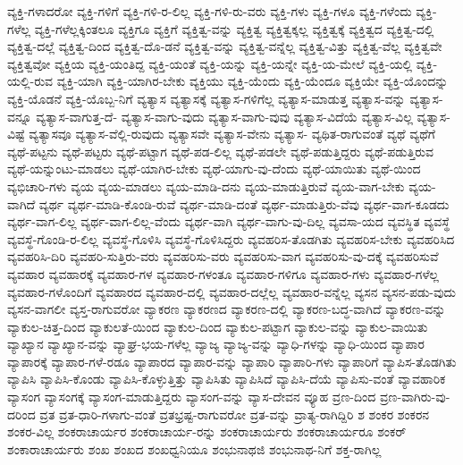 {ವ್ಯಕ್ತಿ-ಗಳಾದರೋ
ವ್ಯಕ್ತಿ-ಗಳಿಗೆ
ವ್ಯಕ್ತಿ-ಗಳಿ-ರ-ಲಿಲ್ಲ
ವ್ಯಕ್ತಿ-ಗಳಿ-ರು-ವರು
ವ್ಯಕ್ತಿ-ಗಳು
ವ್ಯಕ್ತಿ-ಗಳೂ
ವ್ಯಕ್ತಿ-ಗಳೆಂದು
ವ್ಯಕ್ತಿ-ಗಳೆಲ್ಲ
ವ್ಯಕ್ತಿ-ಗಳೆಲ್ಲಕ್ಕಿಂತಲೂ
ವ್ಯಕ್ತಿಗೂ
ವ್ಯಕ್ತಿಗೆ
ವ್ಯಕ್ತಿತ್ವ-ವನ್ನು
ವ್ಯಕ್ತಿತ್ವ
ವ್ಯಕ್ತಿತ್ವಕ್ಕಲ್ಲ
ವ್ಯಕ್ತಿತ್ವಕ್ಕೆ
ವ್ಯಕ್ತಿತ್ವದ
ವ್ಯಕ್ತಿತ್ವ-ದಲ್ಲಿ
ವ್ಯಕ್ತಿತ್ವ-ದಲ್ಲೆ
ವ್ಯಕ್ತಿತ್ವ-ದಿಂದ
ವ್ಯಕ್ತಿತ್ವ-ದೊ-ಡನೆ
ವ್ಯಕ್ತಿತ್ವ-ವನ್ನು
ವ್ಯಕ್ತಿತ್ವ-ವನ್ನೆಲ್ಲ
ವ್ಯಕ್ತಿತ್ವ-ವಿತ್ತು
ವ್ಯಕ್ತಿತ್ವ-ವೆಲ್ಲ
ವ್ಯಕ್ತಿತ್ವವೇ
ವ್ಯಕ್ತಿತ್ವವೋ
ವ್ಯಕ್ತಿಯ
ವ್ಯಕ್ತಿ-ಯಂತಿದ್ದ
ವ್ಯಕ್ತಿ-ಯಂತೆ
ವ್ಯಕ್ತಿ-ಯನ್ನು
ವ್ಯಕ್ತಿ-ಯನ್ನೇ
ವ್ಯಕ್ತಿ-ಯ-ಮೇಲೆ
ವ್ಯಕ್ತಿ-ಯಲ್ಲಿ
ವ್ಯಕ್ತಿ-ಯಲ್ಲಿ-ರುವ
ವ್ಯಕ್ತಿ-ಯಾಗಿ
ವ್ಯಕ್ತಿ-ಯಾಗಿರ-ಬೇಕು
ವ್ಯಕ್ತಿಯು
ವ್ಯಕ್ತಿ-ಯೆಂದು
ವ್ಯಕ್ತಿ-ಯೆಂದೂ
ವ್ಯಕ್ತಿಯೇ
ವ್ಯಕ್ತಿ-ಯೊಂದನ್ನು
ವ್ಯಕ್ತಿ-ಯೊಡನೆ
ವ್ಯಕ್ತಿ-ಯೊಬ್ಬ-ನಿಗೆ
ವ್ಯತ್ಯಾಸ
ವ್ಯತ್ಯಾಸಕ್ಕೆ
ವ್ಯತ್ಯಾಸ-ಗಳಿಗೆಲ್ಲ
ವ್ಯತ್ಯಾಸ-ಮಾಡುತ್ತ
ವ್ಯತ್ಯಾಸ-ವನ್ನು
ವ್ಯತ್ಯಾಸ-ವನ್ನೂ
ವ್ಯತ್ಯಾಸ-ವಾಗುತ್ತ-ದೆ-
ವ್ಯತ್ಯಾಸ-ವಾಗು-ವುದು
ವ್ಯತ್ಯಾಸ-ವಾಗು-ವುವು
ವ್ಯತ್ಯಾಸ-ವಿದೆಯೆ
ವ್ಯತ್ಯಾಸ-ವಿಲ್ಲ
ವ್ಯತ್ಯಾಸ-ವಿಷ್ಟೆ
ವ್ಯತ್ಯಾಸವೂ
ವ್ಯತ್ಯಾಸ-ವೆಲ್ಲಿ-ರುವುದು
ವ್ಯತ್ಯಾಸವೇ
ವ್ಯತ್ಯಾಸ-ವೇನು
ವ್ಯತ್ಯಾಸ-
ವ್ಯಥಿತ-ರಾಗುವಂತೆ
ವ್ಯಥೆ
ವ್ಯಥೆಗೆ
ವ್ಯಥೆ-ಪಟ್ಟನು
ವ್ಯಥೆ-ಪಟ್ಟರು
ವ್ಯಥೆ-ಪಟ್ಟಾಗ
ವ್ಯಥೆ-ಪಡ-ಲಿಲ್ಲ
ವ್ಯಥೆ-ಪಡಲೇ
ವ್ಯಥೆ-ಪಡುತ್ತಿದ್ದರು
ವ್ಯಥೆ-ಪಡುತ್ತಿರುವ
ವ್ಯಥೆ-ಯನ್ನುಂಟು-ಮಾಡಲು
ವ್ಯಥೆ-ಯಾಗಿರ-ಬೇಕು
ವ್ಯಥೆ-ಯಾಗು-ವು-ದೆಂದು
ವ್ಯಥೆ-ಯಾಯಿತು
ವ್ಯಥೆ-ಯಿಂದ
ವ್ಯಭಿಚಾರಿ-ಗಳು
ವ್ಯಯ
ವ್ಯಯ-ಮಾಡಲು
ವ್ಯಯ-ಮಾಡಿ-ದನು
ವ್ಯಯ-ಮಾಡುತ್ತಿರುವೆ
ವ್ಯಯ-ವಾಗ-ಬೇಕು
ವ್ಯಯ-ವಾಗಿದೆ
ವ್ಯರ್ಥ
ವ್ಯರ್ಥ-ಮಾಡಿ-ಕೊಂಡಿ-ರುವೆ
ವ್ಯರ್ಥ-ಮಾಡಿ-ದಂತೆ
ವ್ಯರ್ಥ-ಮಾಡುತ್ತಿರು-ವೆವು
ವ್ಯರ್ಥ-ವಾಗ-ಕೂಡದು
ವ್ಯರ್ಥ-ವಾಗ-ಲಿಲ್ಲ
ವ್ಯರ್ಥ-ವಾಗ-ಲಿಲ್ಲ-ವೆಂದು
ವ್ಯರ್ಥ-ವಾಗಿ
ವ್ಯರ್ಥ-ವಾಗು-ವು-ದಿಲ್ಲ
ವ್ಯವಸಾ-ಯದ
ವ್ಯವಸ್ಥಿತ
ವ್ಯವಸ್ಥೆ
ವ್ಯವಸ್ಥೆ-ಗೊಂಡಿ-ರ-ಲಿಲ್ಲ
ವ್ಯವಸ್ಥೆ-ಗೊಳಿಸಿ
ವ್ಯವಸ್ಥೆ-ಗೊಳಿಸಿದ್ದರು
ವ್ಯವಹರಿಸ-ತೊಡಗಿತು
ವ್ಯವಹರಿಸ-ಬೇಕು
ವ್ಯವಹರಿಸಿದ
ವ್ಯವಹರಿಸಿ-ದಿರಿ
ವ್ಯವಹರಿ-ಸುತ್ತಿರು-ವರು
ವ್ಯವಹರಿಸು-ವರು
ವ್ಯವಹರಿಸು-ವಾಗ
ವ್ಯವಹರಿಸು-ವು-ದಕ್ಕೆ
ವ್ಯವಹರಿಸುವೆ
ವ್ಯವಹಾರ
ವ್ಯವಹಾರಕ್ಕೆ
ವ್ಯವಹಾರ-ಗಳ
ವ್ಯವಹಾರ-ಗಳಂತೂ
ವ್ಯವಹಾರ-ಗಳಿಗೂ
ವ್ಯವಹಾರ-ಗಳು
ವ್ಯವಹಾರ-ಗಳೆಲ್ಲ
ವ್ಯವಹಾರ-ಗಳೊಂದಿಗೆ
ವ್ಯವಹಾರದ
ವ್ಯವಹಾರ-ದಲ್ಲಿ
ವ್ಯವಹಾರ-ದಲ್ಲೆಲ್ಲ
ವ್ಯವಹಾರ-ವನ್ನೆಲ್ಲ
ವ್ಯಸನ
ವ್ಯಸನ-ಪಡು-ವುದು
ವ್ಯಸನ-ವಾಗಲೀ
ವ್ಯಸ್ತ-ರಾಗುವರೋ
ವ್ಯಾಕರಣ
ವ್ಯಾಕರಣದ
ವ್ಯಾಕರಣ-ದಲ್ಲಿ
ವ್ಯಾಕರಣ-ಬದ್ಧ-ವಾಗಿದೆ
ವ್ಯಾಕರಣ-ವನ್ನು
ವ್ಯಾಕುಲ-ಚಿತ್ತ-ದಿಂದ
ವ್ಯಾಕುಲತೆ-ಯಿಂದ
ವ್ಯಾಕುಲ-ದಿಂದ
ವ್ಯಾಕುಲ-ಪಟ್ಟಾಗ
ವ್ಯಾಕುಲ-ವನ್ನು
ವ್ಯಾಕುಲ-ವಾಯಿತು
ವ್ಯಾಖ್ಯಾನ
ವ್ಯಾಖ್ಯಾನ-ವನ್ನು
ವ್ಯಾಘ್ರ-ಭಯ-ಗಳೆಲ್ಲ
ವ್ಯಾಜ್ಯ
ವ್ಯಾಜ್ಯ-ವನ್ನು
ವ್ಯಾಧಿ-ಗಳನ್ನು
ವ್ಯಾಧಿ-ಯಿಂದ
ವ್ಯಾಪಾರ
ವ್ಯಾಪಾರಕ್ಕೆ
ವ್ಯಾಪಾರ-ಗಳೆ-ರಡೂ
ವ್ಯಾಪಾರದ
ವ್ಯಾಪಾರ-ವನ್ನು
ವ್ಯಾಪಾರಿ
ವ್ಯಾಪಾರಿ-ಗಳು
ವ್ಯಾಪಾರಿಗೆ
ವ್ಯಾಪಿಸ-ತೊಡಗಿತು
ವ್ಯಾಪಿಸಿ
ವ್ಯಾಪಿಸಿ-ಕೊಂಡು
ವ್ಯಾಪಿಸಿ-ಕೊಳ್ಳುತ್ತಿತ್ತು
ವ್ಯಾಪಿಸಿತು
ವ್ಯಾಪಿಸಿದೆ
ವ್ಯಾಪಿಸಿ-ದೆಯೆ
ವ್ಯಾಪಿಸು-ವಂತೆ
ವ್ಯಾವಹಾರಿಕ
ವ್ಯಾಸಂಗ
ವ್ಯಾಸಂಗಕ್ಕೆ
ವ್ಯಾಸಂಗ-ಮಾಡುತ್ತಿದ್ದರು
ವ್ಯಾಸಂಗ-ವನ್ನು
ವ್ಯಾಸ-ದೇವನ
ವ್ಯೂಹ
ವ್ರಣ-ದಿಂದ
ವ್ರಣ-ವಾಗಿರು-ವು-ದರಿಂದ
ವ್ರತ
ವ್ರತ-ಧಾರಿ-ಗಳಾಗು-ವಂತೆ
ವ್ರತಭ್ರಷ್ಟ-ರಾಗುವರೋ
ವ್ರತ-ವನ್ನು
ವ್ರಾತ್ಯ-ರಾಗಿದ್ದಿರಿ
ಶ
ಶಂಕರ
ಶಂಕರನ
ಶಂಕರ-ವಿಲ್ಲ
ಶಂಕರಾಚಾರ್ಯರ
ಶಂಕರಾಚಾರ್ಯ-ರನ್ನು
ಶಂಕರಾಚಾರ್ಯರು
ಶಂಕರಾಚಾರ್ಯರೂ
ಶಂಕರ್
ಶಂಕಾರಾಚಾರ್ಯರು
ಶಂಖ
ಶಂಖದ
ಶಂಖಧ್ವನಿಯೂ
ಶಂಭುನಾಥಜಿ
ಶಂಭುನಾಥ-ನಿಗೆ
ಶಕ್ತ-ರಾಗಿಲ್ಲ
}
